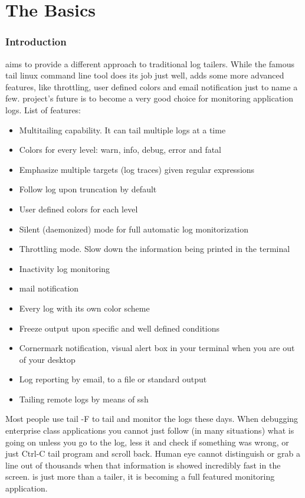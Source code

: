 \pagestyle{fancy}
\part{The Basics}
\section{Introduction}
\logftailer{} aims to provide a different approach to traditional log tailers.
While the famous tail linux
command line tool does its job just well, \logftailer{} adds
some more advanced features, like throttling, user defined colors and email
notification just to name a few. \logftailer{} project's future is to become a very
good choice for monitoring application logs.  
List of features:

\begin{itemize}
 \item Multitailing capability. It can tail multiple logs at a time
 \item Colors for every level: warn, info, debug, error and fatal
 \item Emphasize multiple targets (log traces) given regular expressions
 \item Follow log upon truncation by default
 \item User defined colors for each level
 \item Silent (daemonized) mode for full automatic log monitorization
 \item Throttling mode. Slow down the information being printed in the terminal 
 \item Inactivity log monitoring
 \item mail notification
 \item Every log with its own color scheme
 \item Freeze output upon specific and well defined conditions
 \item Cornermark notification, visual alert box in your terminal when you 
    are out of your desktop
 \item Log reporting by email, to a file or standard output
 \item Tailing remote logs by means of ssh
 
\end{itemize}

Most people use tail -F to tail and monitor the logs these days. When debugging
enterprise class applications you cannot just follow (in many situations) what
is going on unless you go to the log, less it and check if something was wrong,
or just Ctrl-C tail program and scroll back. Human eye cannot distinguish or
grab a line out of thousands when that information is showed incredibly fast in
the screen.  \logftailer{} is just more than a tailer, it is becoming a full
featured monitoring application.

